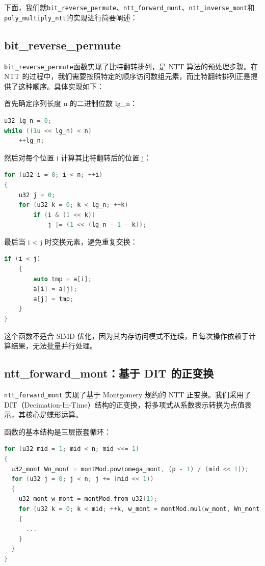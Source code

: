 \documentclass[a4paper]{article}
\begin{document}
下面，我们就\texttt{bit\_reverse\_permute}、\texttt{ntt\_forward\_mont}、\texttt{ntt\_inverse\_mont}和\texttt{poly\_multiply\_ntt}的实现进行简要阐述：

\subsection{bit\_reverse\_permute}

\texttt{bit\_reverse\_permute}函数实现了比特翻转排列，是 NTT 算法的预处理步骤。在 NTT 的过程中，我们需要按照特定的顺序访问数组元素，而比特翻转排列正是提供了这种顺序。具体实现如下：

首先确定序列长度 n 的二进制位数 lg\_n：

\begin{lstlisting}[language=C++]
u32 lg_n = 0;
while ((1u << lg_n) < n)
    ++lg_n;
\end{lstlisting}

然后对每个位置 i 计算其比特翻转后的位置 j：

\begin{lstlisting}[language=C++]
for (u32 i = 0; i < n; ++i)
{
    u32 j = 0;
    for (u32 k = 0; k < lg_n; ++k)
        if (i & (1 << k))
            j |= (1 << (lg_n - 1 - k));
\end{lstlisting}

最后当 i < j 时交换元素，避免重复交换：

\begin{lstlisting}[language=C++]
    if (i < j)
    {
        auto tmp = a[i];
        a[i] = a[j];
        a[j] = tmp;
    }
}
\end{lstlisting}

这个函数不适合 SIMD 优化，因为其内存访问模式不连续，且每次操作依赖于计算结果，无法批量并行处理。

\subsection{ntt\_forward\_mont：基于 DIT 的正变换}

\texttt{ntt\_forward_mont} 实现了基于 Montgomery 规约的 NTT 正变换。我们采用了 DIT（Decimation-In-Time）结构的正变换，将多项式从系数表示转换为点值表示，其核心是蝶形运算。

函数的基本结构是三层嵌套循环：

\begin{lstlisting}[language=C++]
for (u32 mid = 1; mid < n; mid <<= 1)
{
  u32_mont Wn_mont = montMod.pow(omega_mont, (p - 1) / (mid << 1));
  for (u32 j = 0; j < n; j += (mid << 1))
  {
    u32_mont w_mont = montMod.from_u32(1);
    for (u32 k = 0; k < mid; ++k, w_mont = montMod.mul(w_mont, Wn_mont))
    {
      ...
    }
  }
}
\end{lstlisting}
\end{document}
